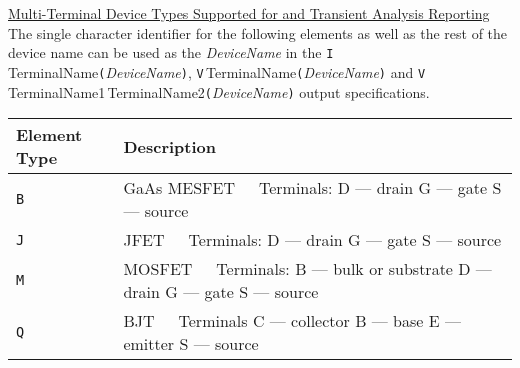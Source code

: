 \noindent
\underline{Multi-Terminal Device Types Supported for \dc and Transient Analysis
Reporting}\\[0.1in]
The single character identifier for the following elements as well as the rest
of the device name can be used as the {\it DeviceName}
in the
{\tt I}{$\,$TerminalName}{\tt (}{\it DeviceName}{\tt )},
{\tt V}{$\,$TerminalName}{\tt (}{\it DeviceName}{\tt )} and\newline
{\tt V}{$\,$TerminalName1$\,$TerminalName2}{\tt (}{\it DeviceName}{\tt )}
output specifications.\\[0.1in]
\hspace*{\fill}
\begin{tabular}{|p{1in}|p{3in}|}
\hline
Element Type & Description\\
\hline
{\tt B} & GaAs MESFET\ \ \ Terminals:\newline
\hspace*{1in}D --- drain\newline
\hspace*{1in}G --- gate\newline
\hspace*{1in}S --- source\\
\hline
{\tt J} & JFET\ \ \ Terminals:\newline
\hspace*{1in}D --- drain\newline
\hspace*{1in}G --- gate\newline
\hspace*{1in}S --- source\\
\hline
{\tt M} & MOSFET\ \ \ Terminals:\newline
\hspace*{1in}B --- bulk or substrate\newline
\hspace*{1in}D --- drain\newline
\hspace*{1in}G --- gate\newline
\hspace*{1in}S --- source\\
\hline
{\tt Q} & BJT\ \ \ Terminals\newline
\hspace*{1in}C --- collector\newline
\hspace*{1in}B --- base\newline
\hspace*{1in}E --- emitter\newline
\hspace*{1in}S --- source\\
\hline
\end{tabular}\\[0.1in]
